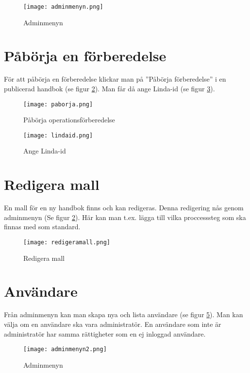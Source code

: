 \documentclass[12pt]{amsart}
\begin{document}
\begin{figure}[H]
	\begin{center}
	\texttt{[image: adminmenyn.png]}
	\caption{Adminmenyn}
	\label{fig:adminmenyn}
	\end{center}
\end{figure}

\section{Påbörja en förberedelse}
För att påbörja en förberedelse klickar man på ''Påbörja förberedelse'' i en publicerad handbok (se figur \ref{fig:paborja}). Man får då ange Linda-id (se figur \ref{fig:lindaid}).

\begin{figure}[H]
	\begin{center}
	\texttt{[image: paborja.png]}
	\caption{Påbörja operationsförberedelse}
	\label{fig:paborja}
	\end{center}
\end{figure}

\begin{figure}[H]
	\begin{center}
	\texttt{[image: lindaid.png]}
	\caption{Ange Linda-id}
	\label{fig:lindaid}
	\end{center}
\end{figure}

\section{Redigera mall}
En mall för en ny handbok finns och kan redigeras. Denna redigering nås genom adminmenyn (Se figur \ref{fig:paborja}). Här kan man t.ex. lägga till vilka proccesssteg som ska finnas med som standard.

\begin{figure}[H]
	\begin{center}
	\texttt{[image: redigeramall.png]}
	\caption{Redigera mall}
	\label{fig:redigeramall}
	\end{center}
\end{figure}

\section{Användare}
Från adminmenyn kan man skapa nya och lista användare (se figur \ref{fig:adminmenyn2}). Man kan välja om en användare ska vara administratör. En användare som inte är administratör har samma rättigheter som en ej inloggad användare.

\begin{figure}[H]
	\begin{center}
	\texttt{[image: adminmenyn2.png]}
	\caption{Adminmenyn}
	\label{fig:adminmenyn2}
	\end{center}
\end{figure}
\end{document}
